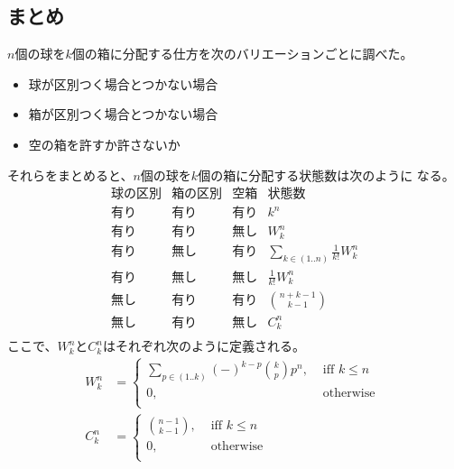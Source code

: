 	\subsection{まとめ}\label{s2:まとめ} %
		$n$個の球を$k$個の箱に分配する仕方を次のバリエーションごとに調べた。
		\begin{itemize}\setlength{\itemsep}{-1mm} %
			\item 球が区別つく場合とつかない場合
			\item 箱が区別つく場合とつかない場合
			\item 空の箱を許すか許さないか
		\end{itemize} %
		それらをまとめると、$n$個の球を$k$個の箱に分配する状態数は次のように
		なる。
		\begingroup
		\renewcommand{\arraystretch}{1.5}
		\begin{equation*}\begin{array}{cccc} %
			\text{球の区別} & \text{箱の区別} & \text{空箱} & \text{状態数} \\
			\text{有り} & \text{有り} & \text{有り} & k^n \\
			\text{有り} & \text{有り} & \text{無し} & W_k^n \\
			\text{有り} & \text{無し} & \text{有り} & \sum_{k\in(1..n)}\frac{1}{k!}W_k^n \\
			\text{有り} & \text{無し} & \text{無し} & \frac{1}{k!}W_k^n \\
			\text{無し} & \text{有り} & \text{有り} & \binom{n+k-1}{k-1} \\
			\text{無し} & \text{有り} & \text{無し} & C_k^n \\
		\end{array}\end{equation*} %
		ここで、$W_k^n$と$C_k^n$はそれぞれ次のように定義される。
		\begin{equation*}\begin{split} %
			W_k^n &= \begin{cases}
				\sum_{p\in(1..k)}(-)^{k-p}\binom{k}{p}p^n, &\text{ iff }k\le n \\
				0, &\text{ otherwise } \\
			\end{cases} \\
			C_k^n &= \begin{cases}
				\binom{n-1}{k-1}, &\text{ iff }k\le n \\
				0, &\text{ otherwise } \\
			\end{cases} \\
		\end{split}\end{equation*} %
		\endgroup

